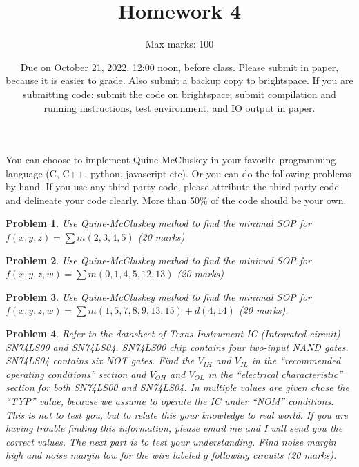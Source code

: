 \documentclass{article}
\title{Homework 4}
\author{Max marks: 100}
\date{Due on October 21, 2022, 12:00 noon, before class. Please submit in paper,
because it is easier to grade. Also submit a backup copy to brightspace. If you
are submitting code: submit the code on brightspace; submit compilation and
running instructions, test environment, and IO output in paper.}
\newtheorem{prob}{Problem}
\begin{document}
\maketitle
You can choose to implement Quine-McCluskey in your favorite programming language
(C, C++, python, javascript etc). Or you can do the following problems by hand.
If you use any third-party code, please attribute the third-party code and
delineate your code clearly.
More than 50\% of the code should be your own.

\begin{prob}
  Use Quine-McCluskey method to find the minimal SOP for $f(x, y, z) = \sum m(2,
  3, 4, 5)$ (20 marks)
\end{prob}

\begin{prob}
  Use Quine-McCluskey method to find the minimal SOP for $f(x, y, z, w) = \sum
  m(0, 1, 4, 5, 12, 13)$ (20 marks)
\end{prob}

\begin{prob}
  Use Quine-McCluskey method to find the minimal SOP for $f(x, y, z, w) = \sum
  m(1, 5, 7, 8, 9, 13, 15) + d(4, 14)$ (20 marks).
\end{prob}


\begin{prob}
  Refer to the datasheet of Texas Instrument IC (Integrated circuit) \href{https://www.ti.com/lit/ds/symlink/sn74ls00.pdf}{SN74LS00} and
  \href{https://www.ti.com/lit/ds/symlink/sn74ls04.pdf}{SN74LS04}. SN74LS00 chip contains four two-input NAND gates. SN74LS04 contains
  six NOT gates. 
  Find the $V_{IH}$ and $V_{IL}$ in the ``recommended operating conditions''
  section and $V_{OH}$ and $V_{OL}$ in the ``electrical characteristic''
  section for both SN74LS00 and SN74LS04. In multiple values are given chose the ``TYP'' value, because we
  assume to operate the IC under ``NOM'' conditions.
  This is not to test you, but to relate this your knowledge to real
  world. If you are having trouble finding this information, please email me and
  I will send you the correct values. The next part is to test your understanding.
  Find noise margin high and
  noise margin low for the wire labeled $g$ following circuits (20 marks).
\end{prob}
\end{document}
